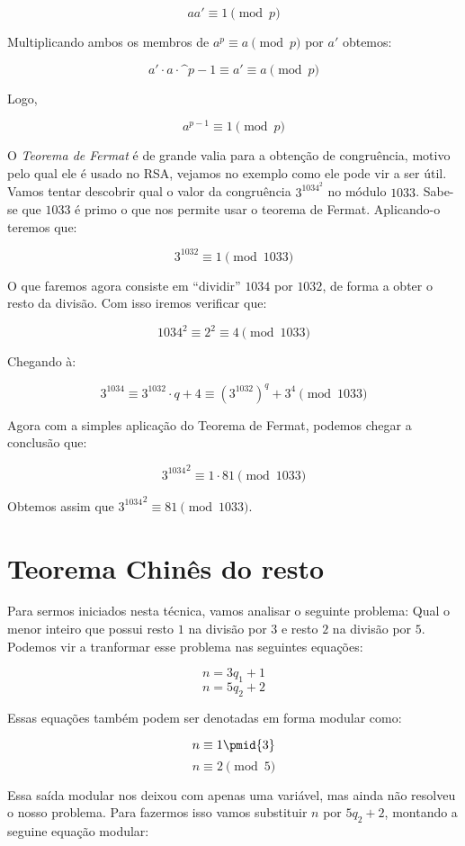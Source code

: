 $$aa' \equiv 1 \pmod{p}$$

Multiplicando ambos os membros de $a^p \equiv a \pmod{p}$ por $a'$ obtemos:

$$a'\cdot a \cdot \^{p-1} \equiv a' \equiv a \pmod{p}$$

Logo,

$$a^{p-1} \equiv 1 \pmod{p}$$
\hfill \newline

O \textit{Teorema de Fermat} \'e de grande valia para a obten\c{c}\~ao de congru\^encia, motivo pelo qual ele \'e usado no RSA, vejamos no exemplo como ele pode vir a ser \'util. Vamos tentar descobrir qual o valor da congru\^encia $3^{1034}^{2}$ no m\'odulo $1033$. Sabe-se que $1033$ \'e primo o que nos permite usar o teorema de Fermat. Aplicando-o teremos que:

$$3^{1032} \equiv 1 \pmod{1033}$$

O que faremos agora consiste em ``dividir'' $1034$ por $1032$, de forma a obter o resto da divis\~ao. Com isso iremos verificar que:

$$1034^2 \equiv 2^2 \equiv 4 \pmod{1033}$$

Chegando \`a:

$$3^{1034} \equiv 3^{1032}\cdot q + 4 \equiv (3^{1032})^{q} + 3^4 \pmod{1033}$$

Agora com a simples aplica\c{c}\~ao do Teorema de Fermat, podemos chegar a conclus\~ao que: 

$${3^{1034}}^2 \equiv 1 \cdot 81 \pmod{1033}$$

Obtemos assim que ${3^{1034}}^{2} \equiv 81 \pmod{1033}$.

\section{Teorema Chin\^es do resto}

Para sermos iniciados nesta t\'ecnica, vamos analisar o seguinte problema: Qual o menor inteiro que possui resto $1$ na divis\~ao por $3$ e resto $2$ na divis\~ao por $5$. Podemos vir a tranformar esse problema nas seguintes equa\c{c}\~oes:

$$n = 3q_1 + 1$$ $$n = 5q_2 + 2$$

Essas equa\c{c}\~oes tamb\'em podem ser denotadas em forma modular como:

$$n \equiv 1\pmid{3}$$ $$n \equiv 2 \pmod{5}$$

Essa sa\'ida modular nos deixou com apenas uma vari\'avel, mas ainda n\~ao resolveu o nosso problema. Para fazermos isso vamos substituir $n$ por $5q_2 + 2$, montando a seguine equa\c{c}\~ao modular:

